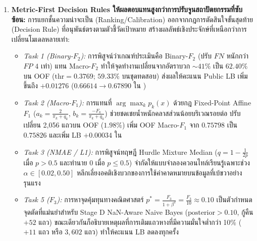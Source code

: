 \begin{enumerate}
  \item \textbf{Metric-First Decision Rules ให้ผลตอบแทนสูงกว่าการปรับจูนสถาปัตยกรรมที่ซับซ้อน:}
  การแยกชั้นความน่าจะเป็น (Ranking/Calibration) ออกจากกฎการตัดสินใจขั้นสุดท้าย (Decision Rule) ที่อนุพันธ์ตรงตามตัวชี้วัดเป้าหมาย สร้างผลลัพธ์เชิงประจักษ์ที่เหนือกว่าการเปลี่ยนโมเดลหลายเท่า:
  \begin{itemize}
    \item \emph{Task 1 (Binary-$F_2$):} การพิสูจน์ว่าเกณฑ์ประเมินคือ Binary-$F_2$ (ปรับ $FN$ หนักกว่า $FP$ $4$ เท่า) แทน Macro-$F_2$ ทำให้จุดทำงานเปลี่ยนจากอัตราบวก $\sim 41\%$ เป็น $62.40\%$ บน OOF ($\text{thr}=0.3769$; $59.33\%$ บนชุดทดสอบ) ส่งผลให้คะแนน Public LB เพิ่มขึ้นถึง $\mathbf{+0.01276}$ ($0.66614 \to 0.67890$ ใน )
    \item \emph{Task 2 (Macro-$F_1$):} การแทนที่ $\arg\max_k p_k(x)$ ด้วยกฎ Fixed-Point Affine $F_1$ ($a_k = \frac{2}{\pi_k+q_k}$, $b_k = \frac{-F_k}{\pi_k+q_k}$) ช่วยชดเชยน้ำหนักคลาสส่วนน้อยบริเวณรอยต่อ ปรับเปลี่ยน 2,056 แถวบน OOF ($1.98\%$) เพิ่ม OOF Macro-$F_1$ จาก $0.75798$ เป็น $\mathbf{0.75826}$ และเพิ่ม LB $+0.00034$ ใน 
    \item \emph{Task 3 (NMAE / L1):} การพิสูจน์ทฤษฎี Hurdle Mixture Median ($q = 1 - \frac{1}{2p}$ เมื่อ $p > 0.5$ และทำนาย $0$ เมื่อ $p \le 0.5$) จำกัดให้แบบจำลองควอนไทล์เรียนรู้เฉพาะช่วง $\alpha \in [0.02, 0.50]$ หลีกเลี่ยงอคติเชิงบวกของการใช้ค่าคาดหมายบนข้อมูลที่เบ้ขวาอย่างรุนแรง
    \item \emph{Task 5 ($F_3$):} การหาจุดคุ้มทุนทางคณิตศาสตร์ $p^* = \frac{F_3}{1+\beta^2} = \frac{F_3}{10} \approx 0.10$ เป็นตัวกำหนดจุดตัดที่แม่นยำสำหรับ Stage D NaN-Aware Naive Bayes ($\text{posterior} > 0.10$, กู้คืน $+52$ แถว) ขณะเดียวกันก็อธิบายเหตุผลที่การเติมแถวหางที่มีความมั่นใจต่ำกว่า 10\% ( $+11$ แถว หรือ  $3{,}602$ แถว) ทำให้คะแนน LB ลดลงทุกครั้ง
  \end{itemize}


\end{enumerate}
